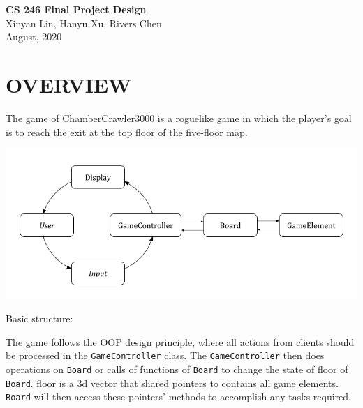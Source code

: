 \documentclass[11pt]{article}
\theoremstyle{plain} \newtheorem{theorem*}{Theorem}[subsection]
\begin{document}
\begin{center}
{\LARGE \textbf{CS 246 Final Project Design}}\\
\vspace{0.15 in}
Xinyan Lin, Hanyu Xu, Rivers Chen\\ 
\vspace{0.07 in} August, 2020 
\end{center}

\vspace{0.3 in} 
\section{OVERVIEW} 
The game of ChamberCrawler3000 is a roguelike game in which the player’s goal
is to reach the exit at the top floor of the five-floor map.  
\begin{center}
    \includegraphics{Flow Chart Cutted.png}
\end{center}
Basic structure:

The game follows the OOP design principle, where all actions from clients
should be processed in the \texttt{GameController} class. The 
\texttt{GameController} then does operations on \texttt{Board} or calls 
of functions of \texttt{Board} to change the state of \textsf{floor} of
\texttt{Board}. \textsf{floor} is a 3d vector that shared pointers to
contains all game elements. \texttt{Board} will then access these pointers'
methods to accomplish any tasks required.\\



\end{document}
